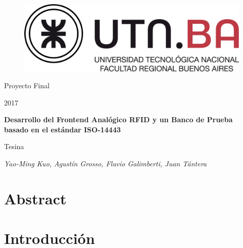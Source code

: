 \documentclass[a4paper,10pt]{article}
\begin{document}
\begin{titlepage}
\centering
\begin{figure}[t]
	\centering
	\includegraphics[scale=0.15]{utn.jpg}
    \vspace{0.5cm}
\end{figure}%
	{\LARGE Proyecto Final\par}
    {\LARGE 2017\par}
	\vspace{1cm}
	{\huge\bfseries Desarrollo del Frontend Analógico RFID y un Banco de Prueba basado en el estándar ISO-14443\par}
	\vspace{1cm}
    {\LARGE Tesina\par}
    \vspace{1cm}
	{\Large\itshape Yao-Ming Kuo, Agustín Grosso, Flavio Galimberti, Juan Tántera\par}
	\vfill
\end{titlepage}


\tableofcontents



\clearpage
\section{Abstract}
\label{sec:abstract}


\section{Introducción}
\label{sec:intro}

\end{document}
